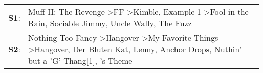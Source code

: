 \begin{supertabular}{p{0.03\textwidth}p{0.92\textwidth}}
 \textbf{S1}:  &                                                               Muff II: The Revenge\textsuperscript{} \textgreater \enspace FF\textsuperscript{} \textgreater \enspace Kimble\textsuperscript{}, \enspace Example 1\textsuperscript{} \textgreater \enspace Fool in the Rain\textsuperscript{}, \enspace Sociable Jimmy\textsuperscript{}, \enspace Uncle Wally\textsuperscript{}, \enspace The Fuzz\textsuperscript{}  \enspace  \\
 \textbf{S2}:  &  Nothing Too Fancy\textsuperscript{} \textgreater \enspace Hangover\textsuperscript{} \textgreater \enspace My Favorite Things\textsuperscript{} \textgreater \enspace Hangover\textsuperscript{}, \enspace Der Bluten Kat\textsuperscript{}, \enspace Lenny\textsuperscript{}, \enspace Anchor Drops\textsuperscript{}, \enspace Nuthin' but a 'G' Thang[1]\textsuperscript{}, 's Theme\textsuperscript{}  \enspace  \\
\end{supertabular}
